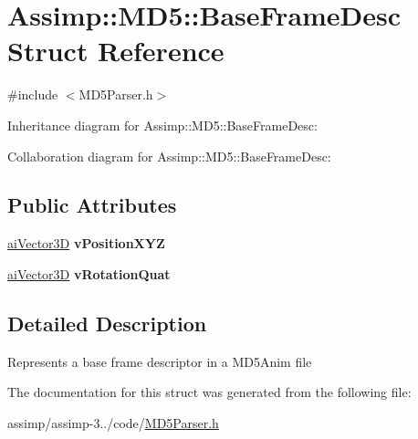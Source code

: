 \hypertarget{struct_assimp_1_1_m_d5_1_1_base_frame_desc}{\section{Assimp\+:\+:M\+D5\+:\+:Base\+Frame\+Desc Struct Reference}
\label{struct_assimp_1_1_m_d5_1_1_base_frame_desc}
}


{\ttfamily \#include $<$M\+D5\+Parser.\+h$>$}



Inheritance diagram for Assimp\+:\+:M\+D5\+:\+:Base\+Frame\+Desc\+:


Collaboration diagram for Assimp\+:\+:M\+D5\+:\+:Base\+Frame\+Desc\+:
\subsection*{Public Attributes}
\begin{DoxyCompactItemize}
\item 
\hypertarget{struct_assimp_1_1_m_d5_1_1_base_frame_desc_ae50e1d4c2a2de8b0cd13af320141a485}{\hyperlink{structai_vector3_d}{ai\+Vector3\+D} {\bfseries v\+Position\+X\+Y\+Z}}\label{struct_assimp_1_1_m_d5_1_1_base_frame_desc_ae50e1d4c2a2de8b0cd13af320141a485}

\item 
\hypertarget{struct_assimp_1_1_m_d5_1_1_base_frame_desc_a7e97edfa075dbd3216e31240a6cd9c35}{\hyperlink{structai_vector3_d}{ai\+Vector3\+D} {\bfseries v\+Rotation\+Quat}}\label{struct_assimp_1_1_m_d5_1_1_base_frame_desc_a7e97edfa075dbd3216e31240a6cd9c35}

\end{DoxyCompactItemize}


\subsection{Detailed Description}
Represents a base frame descriptor in a M\+D5\+Anim file 

The documentation for this struct was generated from the following file\+:\begin{DoxyCompactItemize}
\item 
assimp/assimp-\/3../code/\hyperlink{_m_d5_parser_8h}{M\+D5\+Parser.\+h}\end{DoxyCompactItemize}
